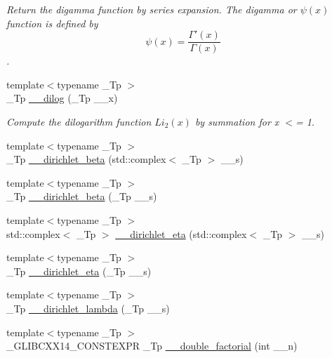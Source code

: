 \begin{DoxyCompactItemize}
\begin{DoxyCompactList}\small\item\em Return the digamma function by series expansion. The digamma or $ \psi(x) $ function is defined by \[ \psi(x) = \frac{\Gamma'(x)}{\Gamma(x)} \]. \end{DoxyCompactList}\item 
{\footnotesize template$<$typename \+\_\+\+Tp $>$ }\\\+\_\+\+Tp \hyperlink{namespacestd_1_1____detail_a5083a0c9fce3299593ca22e7dbaeaf19}{\+\_\+\+\_\+dilog} (\+\_\+\+Tp \+\_\+\+\_\+x)
\begin{DoxyCompactList}\small\item\em Compute the dilogarithm function $ Li_2(x) $ by summation for x $<$= 1. \end{DoxyCompactList}\item 
{\footnotesize template$<$typename \+\_\+\+Tp $>$ }\\\+\_\+\+Tp \hyperlink{namespacestd_1_1____detail_ad0c8e975438d30cbfb5cad91f3ac6d01}{\+\_\+\+\_\+dirichlet\+\_\+beta} (std\+::complex$<$ \+\_\+\+Tp $>$ \+\_\+\+\_\+s)
\item 
{\footnotesize template$<$typename \+\_\+\+Tp $>$ }\\\+\_\+\+Tp \hyperlink{namespacestd_1_1____detail_a2e4243f8d092d48e16fc45ba0c4e9489}{\+\_\+\+\_\+dirichlet\+\_\+beta} (\+\_\+\+Tp \+\_\+\+\_\+s)
\item 
{\footnotesize template$<$typename \+\_\+\+Tp $>$ }\\std\+::complex$<$ \+\_\+\+Tp $>$ \hyperlink{namespacestd_1_1____detail_a3d8d694bf430ca3959c9e6b00c332468}{\+\_\+\+\_\+dirichlet\+\_\+eta} (std\+::complex$<$ \+\_\+\+Tp $>$ \+\_\+\+\_\+s)
\item 
{\footnotesize template$<$typename \+\_\+\+Tp $>$ }\\\+\_\+\+Tp \hyperlink{namespacestd_1_1____detail_a88be5bbcdf85bbc487b6b86b5cb65d98}{\+\_\+\+\_\+dirichlet\+\_\+eta} (\+\_\+\+Tp \+\_\+\+\_\+s)
\item 
{\footnotesize template$<$typename \+\_\+\+Tp $>$ }\\\+\_\+\+Tp \hyperlink{namespacestd_1_1____detail_a6ee8ae93ba65207de8ef3d6bb162b192}{\+\_\+\+\_\+dirichlet\+\_\+lambda} (\+\_\+\+Tp \+\_\+\+\_\+s)
\item 
{\footnotesize template$<$typename \+\_\+\+Tp $>$ }\\\+\_\+\+G\+L\+I\+B\+C\+X\+X14\+\_\+\+C\+O\+N\+S\+T\+E\+X\+PR \+\_\+\+Tp \hyperlink{namespacestd_1_1____detail_a06b0d9786afff0919c96f61d5f760c5f}{\+\_\+\+\_\+double\+\_\+factorial} (int \+\_\+\+\_\+n)

\end{DoxyCompactItemize}
